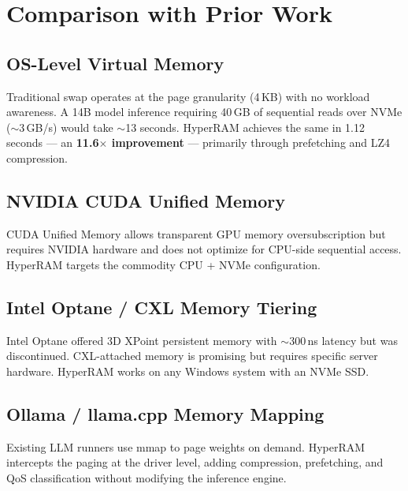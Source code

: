 \documentclass[11pt,a4paper]{article}
\begin{document}
\section{Comparison with Prior Work}
\label{sec:comparison}

\subsection{OS-Level Virtual Memory}

Traditional swap operates at the page granularity (4\,KB) with no workload awareness. A 14B model inference requiring 40\,GB of sequential reads over NVMe ($\sim$3\,GB/s) would take $\sim$13 seconds. HyperRAM achieves the same in 1.12 seconds --- an \textbf{11.6$\times$ improvement} --- primarily through prefetching and LZ4 compression.

\subsection{NVIDIA CUDA Unified Memory}

CUDA Unified Memory allows transparent GPU memory oversubscription but requires NVIDIA hardware and does not optimize for CPU-side sequential access. HyperRAM targets the commodity CPU + NVMe configuration.

\subsection{Intel Optane / CXL Memory Tiering}

Intel Optane offered 3D XPoint persistent memory with $\sim$300\,ns latency but was discontinued. CXL-attached memory is promising but requires specific server hardware. HyperRAM works on any Windows system with an NVMe SSD.

\subsection{Ollama / llama.cpp Memory Mapping}

Existing LLM runners use mmap to page weights on demand. HyperRAM intercepts the paging at the driver level, adding compression, prefetching, and QoS classification without modifying the inference engine.

\end{document}
